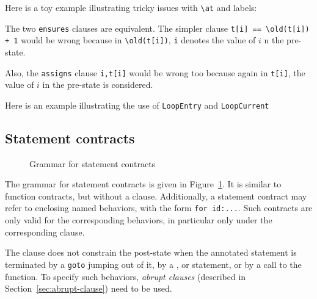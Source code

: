 \begin{example}
  Here is a toy example illustrating tricky issues with \lstinline|\at| and
  labels:


  The two \lstinline|ensures| clauses are equivalent. The simpler clause
  \lstinline|t[i] == \old(t[i]) + 1| would be wrong because in
  \lstinline|\old(t[i])|, \lstinline|i| denotes the value of $i$ n the
  pre-state.

  Also, the \lstinline|assigns| clause \lstinline|i,t[i]| would be
  wrong too because again in \lstinline|t[i]|, the value of $i$ in the
  pre-state is considered.

\end{example}

\begin{example}
Here is an example illustrating the use of \lstinline|LoopEntry| and
\lstinline|LoopCurrent|

\end{example}

\subsection{Statement contracts}
\label{sec:statement_contract}
\begin{figure}[t]
  \begin{cadre}
    
  \end{cadre}
  \caption{Grammar for statement contracts}
  \label{fig:gram:stcontracts}
\end{figure}

The grammar for statement contracts is given in
Figure~\ref{fig:gram:stcontracts}. It is similar to function
contracts, but without a \decreases{} clause. Additionally, a statement contract
may refer to enclosing named behaviors, with the form
\lstinline|for id:...|.
Such contracts are only valid for the
corresponding behaviors, in particular only under the
corresponding \assumes{} clause.


The \ensures{} clause does not constrain the
post-state when the annotated statement is terminated 
by a \lstinline|goto| jumping out of it,
by a \Break{}, \Continue{} or \Return{} statement,
or by a call to the \exit{} function.
To specify such behaviors, \textsl{abrupt clauses} (described in
Section~\ref{sec:abrupt-clause}) need to be used.

